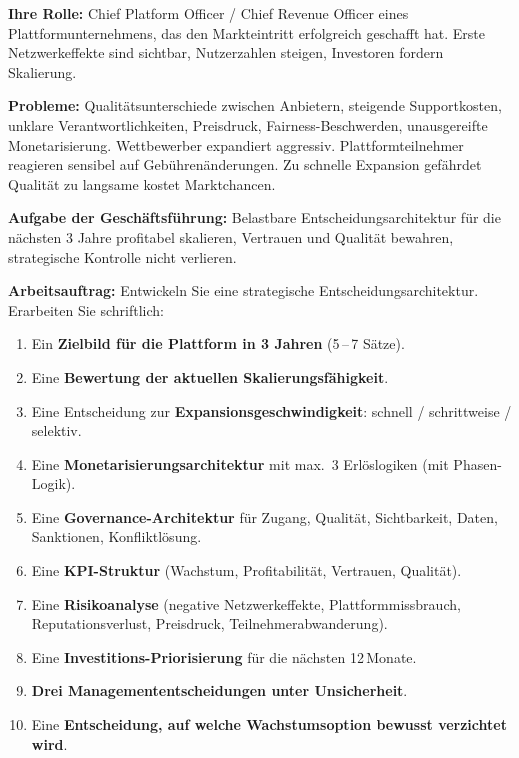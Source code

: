 \documentclass[11pt,a4paper,oneside]{article}
\begin{document}
\begin{infobox}
\textbf{Ihre Rolle:} Chief Platform Officer / Chief Revenue Officer eines Plattformunternehmens, das den Markteintritt erfolgreich geschafft hat. Erste Netzwerkeffekte sind sichtbar, Nutzerzahlen steigen, Investoren fordern Skalierung.

\smallskip
\textbf{Probleme:} Qualitätsunterschiede zwischen Anbietern, steigende Supportkosten, unklare Verantwortlichkeiten, Preisdruck, Fairness-Beschwerden, unausgereifte Monetarisierung. Wettbewerber expandiert aggressiv. Plattformteilnehmer reagieren sensibel auf Gebührenänderungen. Zu schnelle Expansion gefährdet Qualität \textendash{} zu langsame kostet Marktchancen.

\smallskip
\textbf{Aufgabe der Geschäftsführung:} Belastbare Entscheidungsarchitektur für die nächsten 3 Jahre \textendash{} profitabel skalieren, Vertrauen und Qualität bewahren, strategische Kontrolle nicht verlieren.
\end{infobox}

\noindent\textbf{Arbeitsauftrag:} Entwickeln Sie eine strategische Entscheidungsarchitektur. Erarbeiten Sie schriftlich:

\begin{enumerate}
  \item Ein \textbf{Zielbild für die Plattform in 3 Jahren} (5\,--\,7 Sätze).
  \item Eine \textbf{Bewertung der aktuellen Skalierungsfähigkeit}.
  \item Eine Entscheidung zur \textbf{Expansionsgeschwindigkeit}: schnell / schrittweise / selektiv.
  \item Eine \textbf{Monetarisierungsarchitektur} mit max.\ 3 Erlöslogiken (mit Phasen-Logik).
  \item Eine \textbf{Governance-Architektur} für Zugang, Qualität, Sichtbarkeit, Daten, Sanktionen, Konfliktlösung.
  \item Eine \textbf{KPI-Struktur} (Wachstum, Profitabilität, Vertrauen, Qualität).
  \item Eine \textbf{Risikoanalyse} (negative Netzwerkeffekte, Plattformmissbrauch, Reputationsverlust, Preisdruck, Teilnehmerabwanderung).
  \item Eine \textbf{Investitions-Priorisierung} für die nächsten 12\,Monate.
  \item \textbf{Drei Managemententscheidungen unter Unsicherheit}.
  \item Eine \textbf{Entscheidung, auf welche Wachstumsoption bewusst verzichtet wird}.
\end{enumerate}
\end{document}
